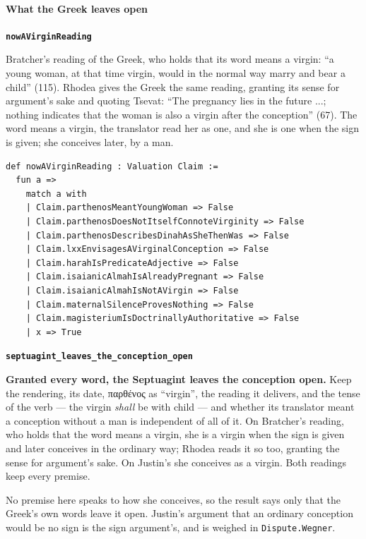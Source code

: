 \documentclass[11pt]{article}
\begin{document}
\paragraph*{What the Greek leaves open}
\leavevmode\par\nobreak
\par\medskip\noindent\textbf{\texttt{now\allowbreak{}AVirgin\allowbreak{}Reading}}\par\nobreak\noindent
Bratcher’s reading of the Greek, who holds that its word means a virgin: “a young woman, at that time virgin, would in the normal way marry and bear a child” (115). Rhodea gives the Greek the same reading, granting its sense for argument’s sake and quoting Tsevat: “The pregnancy lies in the future ...; nothing indicates that the woman is also a virgin after the conception” (67). The word means a virgin, the translator read her as one, and she is one when the sign is given; she conceives later, by a man.

{\small\begin{verbatim}
def nowAVirginReading : Valuation Claim :=
  fun a =>
    match a with
    | Claim.parthenosMeantYoungWoman => False
    | Claim.parthenosDoesNotItselfConnoteVirginity => False
    | Claim.parthenosDescribesDinahAsSheThenWas => False
    | Claim.lxxEnvisagesAVirginalConception => False
    | Claim.harahIsPredicateAdjective => False
    | Claim.isaianicAlmahIsAlreadyPregnant => False
    | Claim.isaianicAlmahIsNotAVirgin => False
    | Claim.maternalSilenceProvesNothing => False
    | Claim.magisteriumIsDoctrinallyAuthoritative => False
    | x => True
\end{verbatim}}
\par\medskip\noindent\textbf{\texttt{septuagint\_\allowbreak{}leaves\_\allowbreak{}the\_\allowbreak{}conception\_\allowbreak{}open}}\par\nobreak\noindent
\textbf{Granted every word, the Septuagint leaves the conception open.} Keep the rendering, its date, παρθένος as “virgin”, the reading it delivers, and the tense of the verb — the virgin \emph{shall} be with child — and whether its translator meant a conception without a man is independent of all of it. On Bratcher’s reading, who holds that the word means a virgin, she is a virgin when the sign is given and later conceives in the ordinary way; Rhodea reads it so too, granting the sense for argument’s sake. On Justin’s she conceives as a virgin. Both readings keep every premise.

No premise here speaks to how she conceives, so the result says only that the Greek’s own words leave it open. Justin’s argument that an ordinary conception would be no sign is the sign argument’s, and is weighed in \texttt{Dispute.Wegner}.
\end{document}
